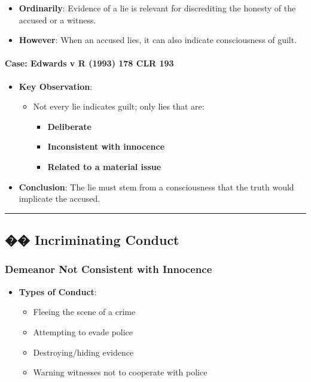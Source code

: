 \begin{itemize}
\tightlist
\item
  \textbf{Ordinarily}: Evidence of a lie is relevant for discrediting
  the honesty of the accused or a witness.
\item
  \textbf{However}: When an accused lies, it can also indicate
  consciousness of guilt.
\end{itemize}

\paragraph{Case: Edwards v R (1993) 178 CLR
193}\label{case-edwards-v-r-1993-178-clr-193}

\begin{itemize}
\tightlist
\item
  \textbf{Key Observation}:

  \begin{itemize}
  \tightlist
  \item
    Not every lie indicates guilt; only lies that are:

    \begin{itemize}
    \tightlist
    \item
      \textbf{Deliberate}
    \item
      \textbf{Inconsistent with innocence}
    \item
      \textbf{Related to a material issue}
    \end{itemize}
  \end{itemize}
\item
  \textbf{Conclusion}: The lie must stem from a consciousness that the
  truth would implicate the accused.
\end{itemize}

\begin{center}\rule{0.5\linewidth}{0.5pt}\end{center}

\subsection{�� Incriminating Conduct}\label{incriminating-conduct}

\subsubsection{Demeanor Not Consistent with
Innocence}\label{demeanor-not-consistent-with-innocence}

\begin{itemize}
\tightlist
\item
  \textbf{Types of Conduct}:

  \begin{itemize}
  \tightlist
  \item
    Fleeing the scene of a crime
  \item
    Attempting to evade police
  \item
    Destroying/hiding evidence
  \item
    Warning witnesses not to cooperate with police
  \end{itemize}
\end{itemize}

